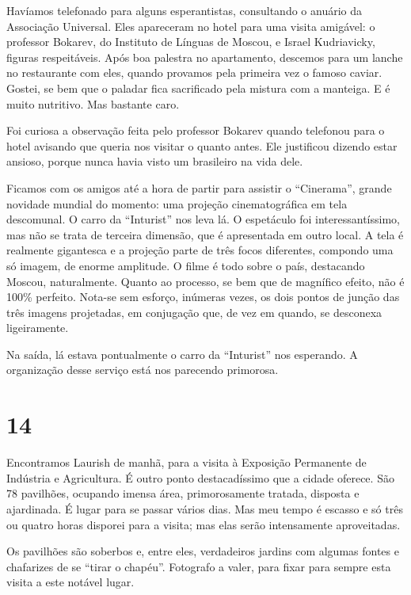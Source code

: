 Havíamos telefonado para alguns esperantistas, consultando o anuário da Associação Universal. Eles apareceram no hotel para uma visita amigável: o professor Bokarev, do Instituto de Línguas de Moscou, e Israel Kudriavicky, figuras respeitáveis. Após boa palestra no apartamento, descemos para um lanche no restaurante com eles, quando provamos pela primeira vez o famoso caviar. Gostei, se bem que o paladar fica sacrificado pela mistura com a manteiga. E é muito nutritivo. Mas bastante caro.

Foi curiosa a observação feita pelo professor Bokarev quando telefonou para o hotel avisando que queria nos visitar o quanto antes. Ele justificou dizendo estar ansioso, porque nunca havia visto um brasileiro na vida dele.

Ficamos com os amigos até a hora de partir para assistir o ``Cinerama'', grande novidade mundial do momento: uma projeção cinematográfica em tela descomunal. O carro da ``Inturist'' nos leva lá. O espetáculo foi interessantíssimo, mas não se trata de terceira dimensão, que é apresentada em outro local. A tela é realmente gigantesca e a projeção parte de três focos diferentes, compondo uma só imagem, de enorme amplitude. O filme é todo sobre o país, destacando Moscou, naturalmente. Quanto ao processo, se bem que de magnífico efeito, não é 100\% perfeito. Nota-se sem esforço, inúmeras vezes, os dois pontos de junção das três imagens projetadas, em conjugação que, de vez em quando, se desconexa ligeiramente.

Na saída, lá estava pontualmente o carro da ``Inturist'' nos esperando. A organização desse serviço está nos parecendo primorosa.

\section*{14 \adfflatleafright {}}
Encontramos Laurish de manhã, para a visita à Exposição Permanente de Indústria e Agricultura. É outro ponto destacadíssimo que a cidade oferece. São 78 pavilhões, ocupando imensa área, primorosamente tratada, disposta e ajardinada. É lugar para se passar vários dias. Mas meu tempo é escasso e só três ou quatro horas disporei para a visita; mas elas serão intensamente aproveitadas.

Os pavilhões são soberbos e, entre eles, verdadeiros jardins com algumas fontes e chafarizes de se ``tirar o chapéu''. Fotografo a valer, para fixar para sempre esta visita a este notável lugar.

